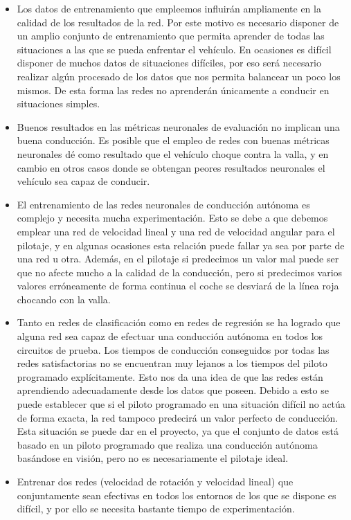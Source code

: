 \begin{itemize}
    \item Los datos de entrenamiento que empleemos influirán ampliamente en la calidad de los resultados de la red. Por este motivo es necesario disponer de un amplio conjunto de entrenamiento que permita aprender de todas las situaciones a las que se pueda enfrentar el vehículo. En ocasiones es difícil disponer de muchos datos de situaciones difíciles, por eso será necesario realizar algún procesado de los datos que nos permita balancear un poco los mismos. De esta forma las redes no aprenderán únicamente a conducir en situaciones simples.
    
    \item Buenos resultados en las métricas neuronales de evaluación no implican una buena conducción. Es posible que el empleo de redes con buenas métricas neuronales dé como resultado que el vehículo choque contra la valla, y en cambio en otros casos donde se obtengan peores resultados neuronales el vehículo sea capaz de conducir.
    
    \item El entrenamiento de las redes neuronales de conducción autónoma es complejo y necesita mucha experimentación. Esto se debe a que debemos emplear una red de velocidad lineal y una red de velocidad angular para el pilotaje, y en algunas ocasiones esta relación puede fallar ya sea por parte de una red u otra. Además, en el pilotaje si predecimos un valor mal puede ser que no afecte mucho a la calidad de la conducción, pero si predecimos varios valores erróneamente de forma continua el coche se desviará de la línea roja chocando con la valla.
    
    \item Tanto en redes de clasificación como en redes de regresión se ha logrado que alguna red sea capaz de efectuar una conducción autónoma en todos los circuitos de prueba. Los tiempos de conducción conseguidos por todas las redes satisfactorias no se encuentran muy lejanos a los tiempos del piloto programado explícitamente. Esto nos da una idea de que las redes están aprendiendo adecuadamente desde los datos que poseen. Debido a esto se puede establecer que si el piloto programado en una situación difícil no actúa de forma exacta, la red tampoco predecirá un valor perfecto de conducción. Esta situación se puede dar en el proyecto, ya que el conjunto de datos está basado en un piloto programado que realiza una conducción autónoma basándose en visión, pero no es necesariamente el pilotaje ideal.
    
    \item Entrenar dos redes (velocidad de rotación y velocidad lineal) que conjuntamente sean efectivas en todos los entornos de los que se dispone es difícil, y por ello se necesita bastante tiempo de experimentación. 
\end{itemize}



